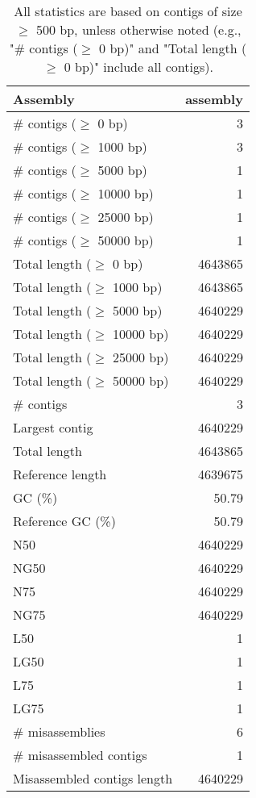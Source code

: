 \documentclass[12pt,a4paper]{article}
\begin{document}
\begin{table}[ht]
\begin{center}
\caption{All statistics are based on contigs of size $\geq$ 500 bp, unless otherwise noted (e.g., "\# contigs ($\geq$ 0 bp)" and "Total length ($\geq$ 0 bp)" include all contigs).}
\begin{tabular}{|l*{1}{|r}|}
\hline
Assembly & assembly \\ \hline
\# contigs ($\geq$ 0 bp) & 3 \\ \hline
\# contigs ($\geq$ 1000 bp) & 3 \\ \hline
\# contigs ($\geq$ 5000 bp) & 1 \\ \hline
\# contigs ($\geq$ 10000 bp) & 1 \\ \hline
\# contigs ($\geq$ 25000 bp) & 1 \\ \hline
\# contigs ($\geq$ 50000 bp) & 1 \\ \hline
Total length ($\geq$ 0 bp) & 4643865 \\ \hline
Total length ($\geq$ 1000 bp) & 4643865 \\ \hline
Total length ($\geq$ 5000 bp) & 4640229 \\ \hline
Total length ($\geq$ 10000 bp) & 4640229 \\ \hline
Total length ($\geq$ 25000 bp) & 4640229 \\ \hline
Total length ($\geq$ 50000 bp) & 4640229 \\ \hline
\# contigs & 3 \\ \hline
Largest contig & 4640229 \\ \hline
Total length & 4643865 \\ \hline
Reference length & 4639675 \\ \hline
GC (\%) & 50.79 \\ \hline
Reference GC (\%) & 50.79 \\ \hline
N50 & 4640229 \\ \hline
NG50 & 4640229 \\ \hline
N75 & 4640229 \\ \hline
NG75 & 4640229 \\ \hline
L50 & 1 \\ \hline
LG50 & 1 \\ \hline
L75 & 1 \\ \hline
LG75 & 1 \\ \hline
\# misassemblies & 6 \\ \hline
\# misassembled contigs & 1 \\ \hline
Misassembled contigs length & 4640229 \\ \hline

\end{tabular}
\end{center}
\end{table}
\end{document}
